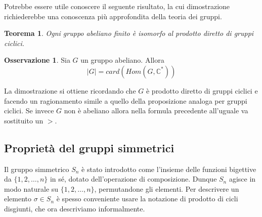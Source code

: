 \documentclass[11pt]{article}
\theoremstyle{plain}
\newtheorem{thm}{Teorema}[section]
\theoremstyle{definition}
\newtheorem*{rem}{Osservazione}
\theoremstyle{remark}
\newcommand{\C}{\mathbb{C}}
\begin{document}
Potrebbe essere utile conoscere il seguente risultato, la cui dimostrazione richiederebbe una conoscenza più approfondita della teoria dei gruppi.
\begin{thm}Ogni gruppo abeliano finito è isomorfo al prodotto diretto di gruppi ciclici.
\end{thm}

\begin{rem} Sia $G$ un gruppo abeliano. Allora 
\[ |G| = card(Hom(G,\C^*))\]

La dimostrazione si ottiene ricordando che $G$ è prodotto diretto di gruppi ciclici e facendo un ragionamento simile a quello
della proposizione analoga per gruppi ciclici.
Se invece $G$ non è abeliano allora nella formula precedente all'uguale va sostituito un $>$.
\end{rem}




\subsection{Proprietà del gruppi simmetrici}
Il gruppo simmetrico $S_n$ è stato introdotto come l'insieme delle funzioni bigettive da $\{1,2,\dots,n\}$ in sé, dotato dell'operazione di composizione.
Dunque $S_n$ agisce in modo naturale su $\{1,2,\dots,n\}$, permutandone gli elementi. Per descrivere un elemento $\sigma \in S_n$ 
è spesso conveniente usare la notazione di prodotto di cicli disgiunti, che ora descriviamo informalmente.
\end{document}
